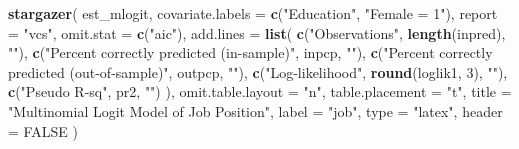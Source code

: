 \documentclass[
  12pt,
]{article}
\newenvironment{Shaded}{\begin{snugshade}}{\end{snugshade}}
\newcommand{\DataTypeTok}[1]{\textcolor[rgb]{0.13,0.29,0.53}{#1}}
\newcommand{\DecValTok}[1]{\textcolor[rgb]{0.00,0.00,0.81}{#1}}
\newcommand{\KeywordTok}[1]{\textcolor[rgb]{0.13,0.29,0.53}{\textbf{#1}}}
\newcommand{\NormalTok}[1]{#1}
\newcommand{\OtherTok}[1]{\textcolor[rgb]{0.56,0.35,0.01}{#1}}
\newcommand{\StringTok}[1]{\textcolor[rgb]{0.31,0.60,0.02}{#1}}
\begin{document}
\begin{Shaded}
\begin{Highlighting}[]
\KeywordTok{stargazer}\NormalTok{(}
\NormalTok{  est\_mlogit,}
  \DataTypeTok{covariate.labels =} \KeywordTok{c}\NormalTok{(}\StringTok{"Education"}\NormalTok{, }\StringTok{"Female = 1"}\NormalTok{),}
  \DataTypeTok{report =} \StringTok{"vcs"}\NormalTok{, }\DataTypeTok{omit.stat =} \KeywordTok{c}\NormalTok{(}\StringTok{"aic"}\NormalTok{),}
  \DataTypeTok{add.lines =} \KeywordTok{list}\NormalTok{(}
    \KeywordTok{c}\NormalTok{(}\StringTok{"Observations"}\NormalTok{, }\KeywordTok{length}\NormalTok{(inpred), }\StringTok{""}\NormalTok{),}
    \KeywordTok{c}\NormalTok{(}\StringTok{"Percent correctly predicted (in{-}sample)"}\NormalTok{, inpcp, }\StringTok{""}\NormalTok{),}
    \KeywordTok{c}\NormalTok{(}\StringTok{"Percent correctly predicted (out{-}of{-}sample)"}\NormalTok{, outpcp, }\StringTok{""}\NormalTok{),}
    \KeywordTok{c}\NormalTok{(}\StringTok{"Log{-}likelihood"}\NormalTok{, }\KeywordTok{round}\NormalTok{(loglik1, }\DecValTok{3}\NormalTok{), }\StringTok{""}\NormalTok{),}
    \KeywordTok{c}\NormalTok{(}\StringTok{"Pseudo R{-}sq"}\NormalTok{, pr2, }\StringTok{""}\NormalTok{)}
\NormalTok{  ),}
  \DataTypeTok{omit.table.layout =} \StringTok{"n"}\NormalTok{, }\DataTypeTok{table.placement =} \StringTok{"t"}\NormalTok{,}
  \DataTypeTok{title =} \StringTok{"Multinomial Logit Model of Job Position"}\NormalTok{,}
  \DataTypeTok{label =} \StringTok{"job"}\NormalTok{,}
  \DataTypeTok{type =} \StringTok{"latex"}\NormalTok{, }\DataTypeTok{header =} \OtherTok{FALSE}  
\NormalTok{)}
\end{Highlighting}
\end{Shaded}
\end{document}
